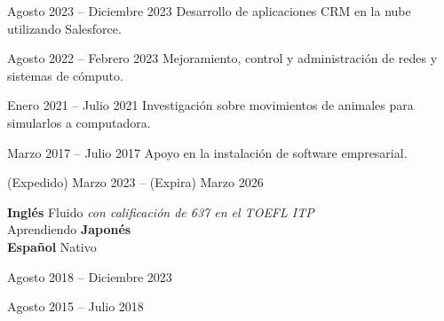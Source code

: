 \documentclass[a4paper,11pt]{memoir} %
\begin{document}
\userinformation %

\framebreak %


\heading{\fullname} %



\Sep


{Agosto 2023 -- Diciembre 2023}
{Desarrollo de aplicaciones CRM en la nube utilizando Salesforce.}

{Agosto 2022 -- Febrero 2023}
{Mejoramiento, control y administración de redes y sistemas de cómputo.}

{Enero 2021 -- Julio 2021}
{Investigación sobre movimientos de animales para simularlos a computadora.}

{Marzo 2017 -- Julio 2017}
{Apoyo en la instalación de software empresarial.}

\Sep


{(Expedido) Marzo 2023 -- (Expira) Marzo 2026}{}

\Sep


\techtable

\Sep


\bluebullet \textbf{Inglés} Fluido \textit{con calificación de 637 en el TOEFL ITP} \\
\bluebullet Aprendiendo \textbf{Japonés} \\
\bluebullet \textbf{Español} Nativo \\


{Agosto 2018 -- Diciembre 2023}{}

{Agosto 2015 -- Julio 2018}{}

\end{document}
